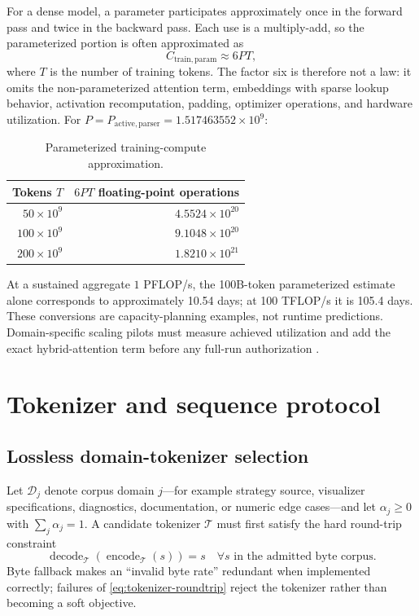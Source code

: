 \documentclass[10pt,letterpaper]{article}
\newcommand{\1}{\mathbb{1}}
\begin{document}
For a dense model, a parameter participates approximately once in the forward pass and twice in the
backward pass.  Each use is a multiply-add, so the parameterized portion is often approximated as
\begin{equation}
  C_{\mathrm{train,param}}\approx6PT,
  \label{eq:6pt}
\end{equation}
where $T$ is the number of training tokens.  The factor six is therefore not a law: it omits the
non-parameterized attention term, embeddings with sparse lookup behavior, activation recomputation,
padding, optimizer operations, and hardware utilization.  For
$P=P_{\mathrm{active,parser}}=1.517463552\times10^9$:
\begin{table}[h]
\centering
\caption{Parameterized training-compute approximation.}
\label{tab:training-compute}
\small
\begin{tabular}{@{}rr@{}}
\toprule Tokens $T$ & $6PT$ floating-point operations \\
\midrule
$50\times10^9$ & $4.5524\times10^{20}$ \\
$100\times10^9$ & $9.1048\times10^{20}$ \\
$200\times10^9$ & $1.8210\times10^{21}$ \\
\bottomrule
\end{tabular}
\end{table}
At a sustained aggregate $1$ PFLOP/s, the 100B-token parameterized estimate alone corresponds to
approximately 10.54 days; at 100 TFLOP/s it is 105.4 days.  These conversions are capacity-planning
examples, not runtime predictions.  Domain-specific scaling pilots must measure achieved utilization
and add the exact hybrid-attention term before any full-run authorization \cite{kaplan2020scaling,hoffmann2022chinchilla}.

\section{Tokenizer and sequence protocol}

\subsection{Lossless domain-tokenizer selection}

Let $\mathcal D_j$ denote corpus domain $j$---for example strategy source, visualizer specifications,
diagnostics, documentation, or numeric edge cases---and let $\alpha_j\ge0$ with
$\sum_j\alpha_j=1$.  A candidate tokenizer $\mathcal T$ must first satisfy the hard round-trip
constraint
\begin{equation}
  \operatorname{decode}_{\mathcal T}(\operatorname{encode}_{\mathcal T}(s))=s
  \quad\forall s\text{ in the admitted byte corpus}.
  \label{eq:tokenizer-roundtrip}
\end{equation}
Byte fallback makes an ``invalid byte rate'' redundant when implemented correctly; failures of
\cref{eq:tokenizer-roundtrip} reject the tokenizer rather than becoming a soft objective.
\end{document}
